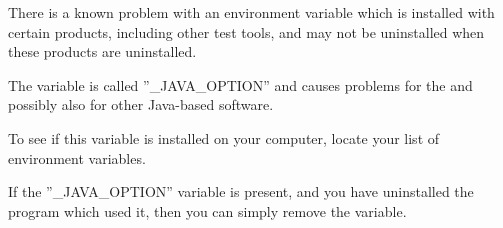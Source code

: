 There is a known problem with an environment variable which is installed with certain products, including other test tools, and may not be uninstalled when these products are uninstalled. 

The variable is called ''\_JAVA\_OPTION'' and causes problems for the \ite{} and possibly also for other Java-based software.

To see if this variable is installed on your computer, locate your list of environment variables.

If the ''\_JAVA\_OPTION'' variable is present, and you have uninstalled the program which used it, then you can simply remove the variable.
